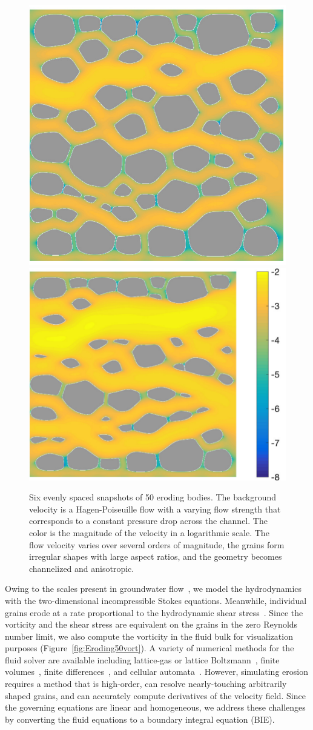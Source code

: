 \documentclass[preprint,10pt]{elsarticle}
\begin{document}
\begin{figure}[H]
\begin{center}
\includegraphics[height = 0.31 \textwidth]{./figs/vel_log_50b320}
\includegraphics[height = 0.31 \textwidth]{./figs/vel_log_50b400}
\caption{\label{fig:Eroding50vel} Six evenly spaced snapshots of 50
eroding bodies.  The background velocity is a Hagen-Poiseuille flow with
a varying flow strength that corresponds to a constant pressure drop
across the channel. The color is the magnitude of the velocity in a
logarithmic scale. The flow velocity varies over several orders of
magnitude, the grains form irregular shapes with large aspect ratios,
and the geometry becomes channelized and anisotropic.}
\end{center}
\end{figure}

Owing to the scales present in groundwater flow~\cite{bea1972}, we model
the hydrodynamics with the two-dimensional incompressible Stokes
equations.  Meanwhile, individual grains erode at a rate proportional to
the hydrodynamic shear stress~\cite{wan-fel2004,
ris-moo-chi-she-zha2012, moore2013self, par-izu2000}.  Since the
vorticity and the shear stress are equivalent on the grains in the zero
Reynolds number limit, we also compute the vorticity in the fluid bulk
for visualization purposes (Figure~\ref{fig:Eroding50vort}).  A variety
of numerical methods for the fluid solver are available including
lattice-gas or lattice Boltzmann~\cite{kop-kat-tim1996, dar-mcc1998},
finite volumes~\cite{suo-liu-gan2019, den-ica-hid2018,
sie-ili-pri-riv-gua2019}, finite differences~\cite{leb-ded-dav-bou2007,
knu-car2005}, and cellular automata~\cite{rot1988}.  However, simulating
erosion requires a method that is high-order, can resolve
nearly-touching arbitrarily shaped grains, and can accurately compute
derivatives of the velocity field.  Since the governing equations are
linear and homogeneous, we address these challenges by converting the
fluid equations to a boundary integral equation (BIE).
\end{document}
